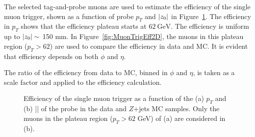 The selected tag-and-probe muons are used to estimate the efficiency of the single muon trigger, shown as a function of probe $p_{T}$ and $|z_{0}|$ in Figure~\ref{fig:MuonTrigEff1D}. The efficiency in $p_{T}$ shows that the efficiency plateau starts at $62~\si{\GeV}$. The efficiency is uniform up to $|z_{0}|\sim$ 150 mm. In Figure~\ref{fig:MuonTrigEff2D}, the muons in this plateau region ($p_{T} > 62$) are used to compare the efficiency in data and MC. It is evident that efficiency depends on both $\phi$ and $\eta$. 

The ratio of the efficiency from data to MC, binned in $\phi$ and $\eta$, is taken as a scale factor and applied to the efficiency calculation.


\begin{figure}[!htb]
    \centering
    \caption{Efficiency of the single muon trigger as a function of the (a) $p_{T}$ and (b) |\zzero| of the probe in the data and $Z$+jets MC samples. Only the muons in the plateau region ($p_{T} > 62$ GeV) of (a) are considered in (b).}
    \label{fig:MuonTrigEff1D}
\end{figure}


